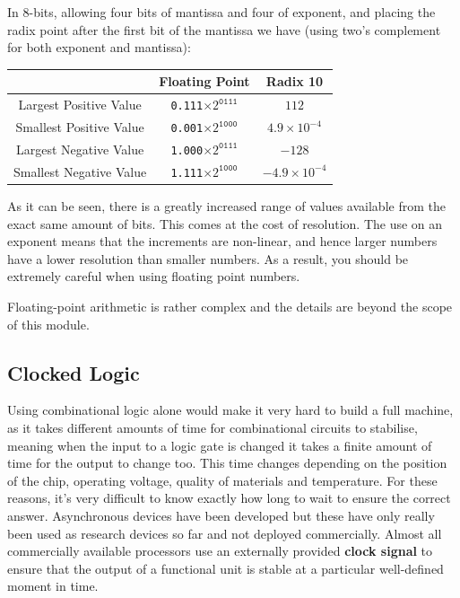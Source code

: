 \documentclass{article}
\begin{document}
	In 8-bits, allowing four bits of mantissa and four of exponent, and placing the radix point after the first bit of the mantissa we have (using two's complement for both exponent and mantissa):
	
	\begin{tabular}{c | c c}
	& Floating Point & Radix 10 \\ \hline
	Largest Positive Value & \texttt{0.111}$\times 2^{\texttt{0111}}$ & $112$ \\
	Smallest Positive Value & \texttt{0.001}$\times 2^{\texttt{1000}}$ & $4.9 \times 10^{-4}$ \\
	Largest Negative Value & \texttt{1.000}$\times 2^{\texttt{0111}}$ & $-128$ \\
	Smallest Negative Value & \texttt{1.111}$\times 2^{\texttt{1000}}$ & $-4.9 \times 10^{-4}$
	\end{tabular}	
	
	As it can be seen, there is a greatly increased range of values available from the exact same amount of bits. This comes at the cost of resolution. The use on an exponent means that the increments are non-linear, and hence larger numbers have a lower resolution than smaller numbers. As a result, you should be extremely careful when using floating point numbers.
	
	Floating-point arithmetic is rather complex and the details are beyond the scope of this module.
	
	\subsection{Clocked Logic}
	Using combinational logic alone would make it very hard to build a full machine, as it takes different amounts of time for combinational circuits to stabilise, meaning when the input to a logic gate is changed it takes a finite amount of time for the output to change too. This time changes depending on the position of the chip, operating voltage, quality of materials and temperature. For these reasons, it's very difficult to know exactly how long to wait to ensure the correct answer. Asynchronous devices have been developed but these have only really been used as research devices so far and not deployed commercially. Almost all commercially available processors use an externally provided \textbf{clock signal} to ensure that the output of a functional unit is stable at a particular well-defined moment in time.
	
\end{document}
